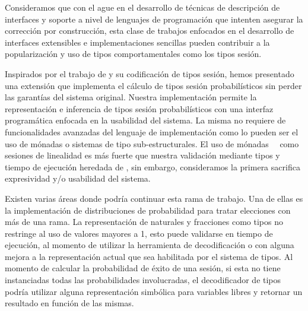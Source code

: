 Consideramos que con el ague en el desarrollo de técnicas de descripción de
interfaces y soporte a nivel de lenguajes de programación que intenten asegurar
la corrección por construcción, esta clase de trabajos enfocados en el
desarrollo de interfaces extensibles e implementaciones sencillas pueden
contribuir a la popularización y uso de tipos comportamentales como los tipos
sesión.

Inspirados por el trabajo de \FuSe y su codificación de tipos sesión, hemos
presentado una extensión que implementa el cálculo de tipos sesión
probabilísticos sin perder las garantías del sistema original. Nuestra
implementación permite la representación e inferencia de tipos sesión
probabilísticos con una interfaz programática enfocada en la usabilidad del
sistema. La misma no requiere de funcionalidades avanzadas del lenguaje de
implementación como lo pueden ser el uso de mónadas o sistemas de tipo
sub-estructurales. El uso de mónadas~\cite{fmt18}~\cite{pucella08} como
sesiones de linealidad es más fuerte que nuestra validación mediante tipos y
tiempo de ejecución heredada de \FuSe, sin embargo, consideramos la primera
sacrifica expresividad y/o usabilidad del sistema.

Existen varias áreas donde podría continuar esta rama de trabajo. Una de ellas
es la implementación de distribuciones de probabilidad para tratar elecciones
con más de una rama. La representación de naturales y fracciones como tipos no
restringe al uso de valores mayores a 1, esto puede validarse en tiempo de
ejecución, al momento de utilizar la herramienta de decodificación o con alguna
mejora a la representación actual que sea habilitada por el sistema de tipos.
Al momento de calcular la probabilidad de éxito de una sesión, si esta no tiene
instanciadas todas las probabilidades involucradas, el decodificador de tipos
podría utilizar alguna representación simbólica para variables libres y
retornar un resultado en función de las mismas.
